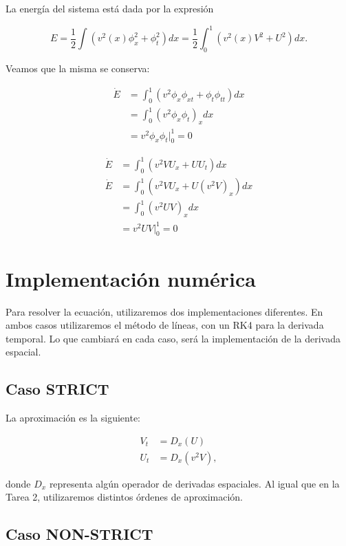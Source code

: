 \documentclass[12pt]{article}
\begin{document}
La energ\'ia del sistema est\'a dada por la expresi\'on

\begin{equation}
E = \dfrac{1}{2}\int (v^2(x) \phi_x^2 + \phi_t^2) dx = \dfrac{1}{2} \int_0^1 (v^2(x) V^2 + U^2) dx.
\end{equation}

Veamos que la misma se conserva:

\begin{align}
\dot{E} &=  \int_0^1 (v^2\phi_x \phi_{xt} + \phi_t \phi_{tt}) dx \nonumber\\
&=  \int_0^1 (v^2 \phi_x \phi_t)_x dx \nonumber \\
&=  v^2 \phi_x \phi_t \bigg|_0^1 = 0
\end{align}

\begin{align}
\dot{E} &=  \int_0^1 (v^2 V U_x + U U_t) dx \nonumber\\
\dot{E} &=  \int_0^1 (v^2 V U_x + U (v^2 V)_x) dx \nonumber\\
&=  \int_0^1 (v^2 U V)_x dx \nonumber \\
&=  v^2 U V \bigg|_0^1 = 0
\end{align}

\section{Implementaci\'on num\'erica}

Para resolver la ecuaci\'on, utilizaremos dos implementaciones diferentes. En ambos casos utilizaremos el m\'etodo de l\'ineas, con un RK4 para la derivada temporal. Lo que cambiar\'a en cada caso, ser\'a la implementaci\'on de la derivada espacial. 

\subsection{Caso \textbf{STRICT}}

La aproximaci\'on es la siguiente:

\begin{align}
V_t &= D_x(U) \\
U_t &= D_x (v^2 V),
\end{align}

donde $D_x$ representa alg\'un operador de derivadas espaciales. Al igual que en la Tarea 2, utilizaremos distintos \'ordenes de aproximaci\'on.



\subsection{Caso \textbf{NON-STRICT}}
\end{document}
